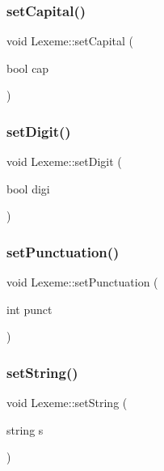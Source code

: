 \subsubsection{\texorpdfstring{set\+Capital()}{setCapital()}}
{\footnotesize\ttfamily void Lexeme\+::set\+Capital (\begin{DoxyParamCaption}\item[{bool}]{cap }\end{DoxyParamCaption})\hspace{0.3cm}{\ttfamily [inline]}}

\mbox{\label{class_lexeme_a4bf15e88113bc3cd10dff188fef37752}} 
\subsubsection{\texorpdfstring{set\+Digit()}{setDigit()}}
{\footnotesize\ttfamily void Lexeme\+::set\+Digit (\begin{DoxyParamCaption}\item[{bool}]{digi }\end{DoxyParamCaption})\hspace{0.3cm}{\ttfamily [inline]}}

\mbox{\label{class_lexeme_a620288e33ed2b3957023b3d325febc13}} 
\subsubsection{\texorpdfstring{set\+Punctuation()}{setPunctuation()}}
{\footnotesize\ttfamily void Lexeme\+::set\+Punctuation (\begin{DoxyParamCaption}\item[{int}]{punct }\end{DoxyParamCaption})\hspace{0.3cm}{\ttfamily [inline]}}

\mbox{\label{class_lexeme_a90a1a2080fb503b0a206a075fd4d038a}} 
\subsubsection{\texorpdfstring{set\+String()}{setString()}}
{\footnotesize\ttfamily void Lexeme\+::set\+String (\begin{DoxyParamCaption}\item[{string}]{s }\end{DoxyParamCaption})\hspace{0.3cm}{\ttfamily [inline]}}

